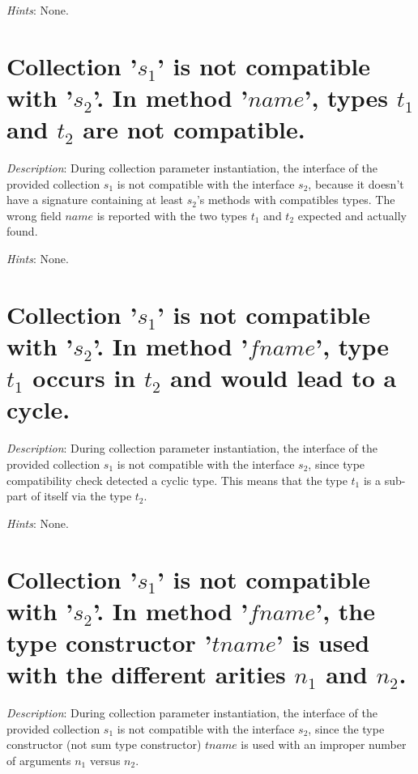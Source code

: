 {\em Hints}: None.

\section*{Collection '$s_1$' is not compatible with '$s_2$'. In method
  '$name$', types $t_1$ and $t_2$ are not compatible.}

{\em Description}: During collection parameter instantiation, the
interface of the provided collection  $s_1$ is not compatible with the
interface  $s_2$, because it doesn't have a signature containing at
least $s_2$'s methods with compatibles types. The wrong field $name$
is reported with the two types $t_1$ and $t_2$ expected and actually
found.

{\em Hints}: None.



\section*{Collection '$s_1$' is not compatible with '$s_2$'. In method
  '$fname$', type $t_1$ occurs in $t_2$ and would lead to a cycle.}

{\em Description}: During collection parameter instantiation, the interface
of the provided collection $s_1$ is not compatible with the interface $s_2$,
since type compatibility check detected a cyclic type. This means that the
type $t_1$ is a sub-part of itself via the type $t_2$.

{\em Hints}: None.



\section*{Collection  '$s_1$' is not compatible with '$s_2$'. In method
  '$fname$', the type constructor '$tname$' is used with the different
  arities $n_1$ and $n_2$.}

{\em Description}: During collection parameter instantiation, the interface
of the provided collection $s_1$ is not compatible with the interface $s_2$,
since the type constructor (not sum type constructor) $tname$ is used with an
improper number of arguments $n_1$ versus $n_2$.

